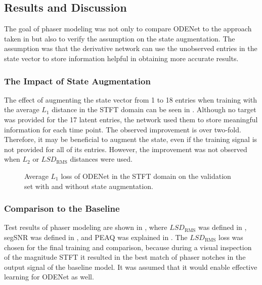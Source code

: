 \subsection{Results and Discussion}
\label{sec:phaser_results}

The goal of phaser modeling was not only to compare ODENet to the approach taken in \cite{Wright2020} but also to verify the assumption on the state augmentation. The assumption was that the derivative network can use the unobserved entries in the state vector to store information helpful in obtaining more accurate results.

\subsubsection{The Impact of State Augmentation}
The effect of augmenting the state vector from 1 to 18 entries when training with the average $L_1$ distance in the \ac{STFT} domain can be seen in . Although no target was provided for the 17 latent entries, the network used them to store meaningful information for each time point. The observed improvement is over two-fold. Therefore, it may be beneficial to augment the state, even if the training signal is not provided for all of its entries. However, the improvement was not observed when $L_2$ or $LSD_\text{RMS}$ distances were used.

\begin{figure}
    \centering
    
    \caption{Average $L_1$ loss of ODENet in the \ac{STFT} domain on the validation set with and without state augmentation.}
    \label{fig:state_augmentation}
\end{figure}

\subsubsection{Comparison to the Baseline}

Test results of phaser modeling are shown in , where $LSD_\text{RMS}$ was defined in , \ac{segSNR} was defined in , and \ac{PEAQ} was explained in . The $LSD_\text{RMS}$  loss was chosen for the final training and comparison, because during a visual inspection of the magnitude \ac{STFT} it resulted in the best match of phaser notches in the output signal of the baseline model. It was assumed that it would enable effective learning for ODENet as well.

